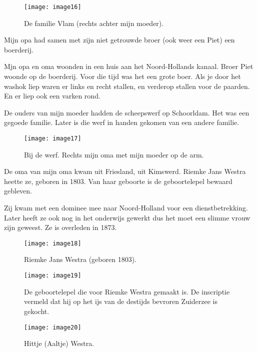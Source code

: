 \begin{figure}[h]
    \texttt{[image: image16]}
    \caption{De familie Vlam (rechts achter mijn moeder).}
\end{figure}

Mijn opa had samen met zijn niet getrouwde broer (ook weer een Piet) een boerderij. 

Mjn opa en oma woonden in een huis aan het Noord-Hollands kanaal. Broer Piet woonde op de boerderij. Voor die tijd was het een grote boer. Als je door het washok liep waren er links en recht stallen, en verderop stallen voor de paarden. En er liep ook een varken rond.

De ouders van mijn moeder hadden de scheepswerf op Schoorldam. Het was een gegoede familie. Later is die werf in handen gekomen van een andere familie. 

\begin{figure}[h]
    \texttt{[image: image17]}
    \caption{Bij de werf. Rechts mijn oma met mijn moeder op de arm.}
\end{figure}

De oma van mijn oma kwam uit Friesland, uit Kimswerd. Riemke Jans Westra heette ze, geboren in 1803. Van haar geboorte is de geboortelepel bewaard gebleven. 

Zij kwam met een dominee mee naar Noord-Holland voor een dienstbetrekking. Later heeft ze ook nog in het onderwijs gewerkt dus het moet een slimme vrouw zijn geweest. Ze is overleden in 1873.

\begin{figure}[h]
    \begin{centering}
    \texttt{[image: image18]}
    \caption{Riemke Jans Westra (geboren 1803).}
    \end{centering}
\end{figure}

\begin{figure}[h]
    \begin{centering}
    \texttt{[image: image19]}
    \caption{De geboortelepel die voor Riemke Westra gemaakt is. De inscriptie vermeld dat hij op het ijs van de destijds bevroren Zuiderzee is gekocht.}
    \end{centering}
\end{figure}


\begin{figure}[h]
    \begin{centering}
    \texttt{[image: image20]}
    \caption{Hittje (Aaltje) Westra.}
    \end{centering}
\end{figure}

